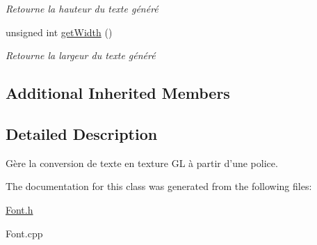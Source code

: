 \begin{DoxyCompactItemize}
\begin{DoxyCompactList}\small\item\em Retourne la hauteur du texte généré \end{DoxyCompactList}\item 
\hypertarget{classFont_aea596fdec8f7f754d90bac37013686bf}{unsigned int \hyperlink{classFont_aea596fdec8f7f754d90bac37013686bf}{get\+Width} ()}\label{classFont_aea596fdec8f7f754d90bac37013686bf}

\begin{DoxyCompactList}\small\item\em Retourne la largeur du texte généré \end{DoxyCompactList}\end{DoxyCompactItemize}
\subsection*{Additional Inherited Members}


\subsection{Detailed Description}
Gère la conversion de texte en texture G\+L à partir d'une police. 

The documentation for this class was generated from the following files\+:\begin{DoxyCompactItemize}
\item 
\hyperlink{Font_8h}{Font.\+h}\item 
Font.\+cpp\end{DoxyCompactItemize}
